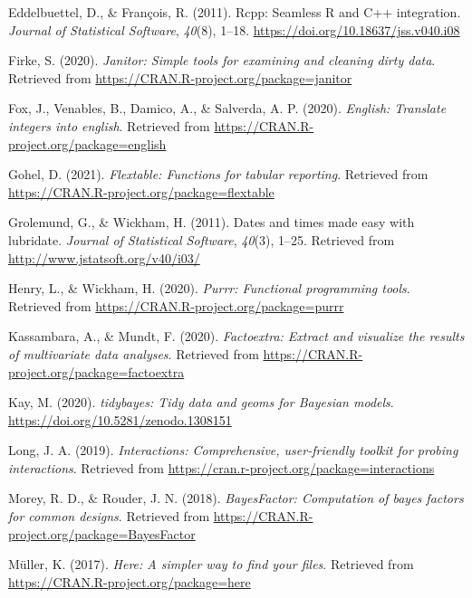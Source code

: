 \documentclass[
  english,
  jou,floatsintext]{apa6}
\begin{document}
\leavevmode\hypertarget{ref-R-Rcpp_a}{}%
Eddelbuettel, D., \& François, R. (2011). Rcpp: Seamless R and C++ integration. \emph{Journal of Statistical Software}, \emph{40}(8), 1--18. \url{https://doi.org/10.18637/jss.v040.i08}

\leavevmode\hypertarget{ref-R-janitor}{}%
Firke, S. (2020). \emph{Janitor: Simple tools for examining and cleaning dirty data}. Retrieved from \url{https://CRAN.R-project.org/package=janitor}

\leavevmode\hypertarget{ref-R-english}{}%
Fox, J., Venables, B., Damico, A., \& Salverda, A. P. (2020). \emph{English: Translate integers into english}. Retrieved from \url{https://CRAN.R-project.org/package=english}

\leavevmode\hypertarget{ref-R-flextable}{}%
Gohel, D. (2021). \emph{Flextable: Functions for tabular reporting}. Retrieved from \url{https://CRAN.R-project.org/package=flextable}

\leavevmode\hypertarget{ref-R-lubridate}{}%
Grolemund, G., \& Wickham, H. (2011). Dates and times made easy with lubridate. \emph{Journal of Statistical Software}, \emph{40}(3), 1--25. Retrieved from \url{http://www.jstatsoft.org/v40/i03/}

\leavevmode\hypertarget{ref-R-purrr}{}%
Henry, L., \& Wickham, H. (2020). \emph{Purrr: Functional programming tools}. Retrieved from \url{https://CRAN.R-project.org/package=purrr}

\leavevmode\hypertarget{ref-R-factoextra}{}%
Kassambara, A., \& Mundt, F. (2020). \emph{Factoextra: Extract and visualize the results of multivariate data analyses}. Retrieved from \url{https://CRAN.R-project.org/package=factoextra}

\leavevmode\hypertarget{ref-R-tidybayes}{}%
Kay, M. (2020). \emph{tidybayes: Tidy data and geoms for Bayesian models}. \url{https://doi.org/10.5281/zenodo.1308151}

\leavevmode\hypertarget{ref-R-interactions}{}%
Long, J. A. (2019). \emph{Interactions: Comprehensive, user-friendly toolkit for probing interactions}. Retrieved from \url{https://cran.r-project.org/package=interactions}

\leavevmode\hypertarget{ref-R-BayesFactor}{}%
Morey, R. D., \& Rouder, J. N. (2018). \emph{BayesFactor: Computation of bayes factors for common designs}. Retrieved from \url{https://CRAN.R-project.org/package=BayesFactor}

\leavevmode\hypertarget{ref-R-here}{}%
Müller, K. (2017). \emph{Here: A simpler way to find your files}. Retrieved from \url{https://CRAN.R-project.org/package=here}
\end{document}
